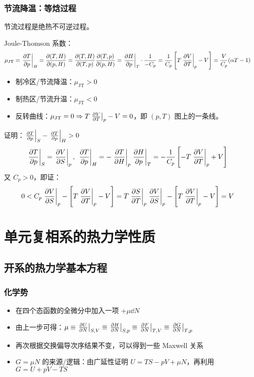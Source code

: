 \subsubsection{节流降温：等焓过程}

节流过程是绝热不可逆过程。

Joule-Thomson 系数：
\[
    \mu_{\text{JT}} = \left.\pdv{T}{p}\right|_H = \pdv{(T, H)}{(p, H)} = \pdv{(T, H)}{(T, p)} \pdv{(T, p)}{(p, H)} = \left.\pdv{H}{p}\right|_T \cdot \frac{1}{- C_p} = \frac{1}{C_p} \left[T \left.\pdv{V}{T}\right|_p - V\right] = \frac{V}{C_p} (\alpha T - 1)
\]

\begin{itemize}
    \item 制冷区/节流降温：$\mu_{\text{JT}} > 0$
    \item 制热区/节流升温：$\mu_{\text{JT}} < 0$
    \item 反转曲线：$\mu_{\text{JT}} = 0 \Rightarrow T \left.\pdv{V}{T}\right|_p - V = 0$，即 $(p, T)$ 图上的一条线。
\end{itemize}

\begin{framed}
    证明：$\left.\pdv{T}{p}\right|_S - \left.\pdv{T}{p}\right|_H > 0$
    \[
        \left.\pdv{T}{p}\right|_S = \left.\pdv{V}{S}\right|_p,\ \left.\pdv{T}{p}\right|_H = - \left.\pdv{T}{H}\right|_p \left.\pdv{H}{p}\right|_T = - \frac{1}{C_p} \left[- T \left.\pdv{V}{T}\right|_p + V\right]
    \]
    又 $C_p > 0$，即证：
    \[
        0 < C_p \left.\pdv{V}{S}\right|_p - \left[T \left.\pdv{V}{T}\right|_p - V\right] = T \left.\pdv{S}{T}\right|_p \left.\pdv{V}{S}\right|_p - \left[T \left.\pdv{V}{T}\right|_p - V\right] = V
    \]
\end{framed}

\section{单元复相系的热力学性质}

\subsection{开系的热力学基本方程}

\subsubsection{化学势}
\begin{itemize}
    \item 在四个态函数的全微分中加入一项 $+ \mu \dd{N}$
    \item 由上一步可得：$\mu \equiv \left.\pdv{U}{N}\right|_{S, V} \equiv \left.\pdv{H}{N}\right|_{S, p} \equiv \left.\pdv{F}{N}\right|_{T, V} \equiv \left.\pdv{G}{N}\right|_{T, p}$
    \item 再次根据交换偏导次序结果不变，可以得到一些 Maxwell 关系
    \item $G = \mu N$ 的来源/逻辑：由广延性证明 $U = T S - p V + \mu N$，再利用 $G = U + p V - T S$
\end{itemize}

